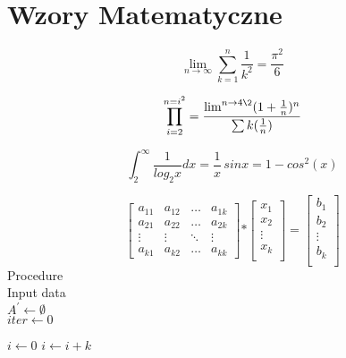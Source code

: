 ﻿\documentclass[a4paper,12pt]{article}
\title{}
\author{Adam Rembiewski}
\begin{document}
\maketitle

\section{Wzory Matematyczne}
$$\lim_{n \to \infty}\sum_{k=1}^n \frac{1}{k^2}= \frac{\pi^2}{6}$$

$$\prod_{i=2}^{n=i^2}= \frac{\lim^{n \to 4\2}(1+\frac{1}{n})^n}{\sum k(\frac{1}{n})}$$

$$\int_{2}^{\infty}\frac{1}{log_{2}x}dx=\frac{1}{x}\, sinx=1-cos^2(x)$$

$$
\left[\begin{array}{cccc}
a_{11} & a_{12} & \dots & a_{1k}\\
a_{21} & a_{22} & \dots & a_{2k}\\
\vdots & \vdots & \ddots& \vdots \\
a_{k1} & a_{k2} & \dots & a_{kk}
\end{array}\right]
\mathbf *
\left[\begin{array}{c}
x_{1} \\
x_{2} \\
\vdots \\
x_{k} \\
\end{array}\right]
\mathbf =
\left[\begin{array}{c}
b_{1} \\
b_{2} \\
\vdots \\
b_{k} \\
\end{array}\right]
$$
Procedure\\
Input data\\
${A^'} {\gets \emptyset}$\\
$iter \gets 0$
\begin{algorithmic}

    \State $i\gets 0$
\Else
        \State $i\gets i+k$
    \EndIf
\EndIf
\end{algorithmic}
\end{document}
